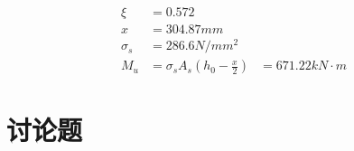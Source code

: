 \documentclass{article}
\begin{document}
\begin{questionList}
\begin{enumerate}
\begin{align*}
                        \xi                          & =0.572                                           \\
                        x                            & =304.87mm                                        \\
                        \sigma_s                     & =286.6N/mm^2                                     \\
                        M_u                          & =\sigma_sA_s(h_0-\frac{x}{2}) & =671.22kN\cdot m
                  \end{align*}
      \end{enumerate}
      \setcounter{enumi}{9}
      \item 
\end{questionList}
\section{讨论题}
\end{document}
